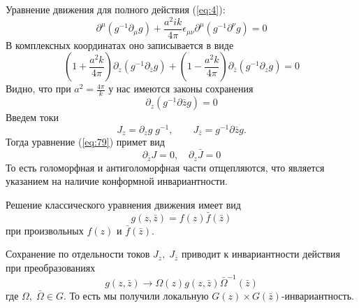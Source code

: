 Уравнение движения для полного действия (\ref{eq:4}):
\begin{equation}
  \label{eq:77}
  \partial^{\mu}(g^{-1}\partial_{\mu}g)+\frac{a^2 ik}{4\pi}\epsilon_{\mu\nu}\partial^{\mu}(g^{-1}\partial^{\nu}g)=0
\end{equation}
В комплексных координатах оно записывается в виде
\begin{equation}
  \label{eq:78}
  \left(1+\frac{a^2 k}{4\pi}\right)\partial_z(g^{-1}\partial_{\bar z}g)+\left(1-\frac{a^2 k}{4\pi}\right)\partial_{\bar z}(g^{-1}\partial_z g)=0
\end{equation}
Видно, что при $a^2=\frac{4\pi}{k}$ у нас имеются законы сохранения
\begin{equation}
  \label{eq:79}
  \partial_z(g^{-1}\partial{\bar z}g)=0
\end{equation}
Введем токи
\begin{equation}
  \label{eq:72}
  J_z=\partial_z g\;g^{-1}, \qquad J_{\bar{z}}=g^{-1}\partial{\bar z}g.
\end{equation}
Тогда уравнение (\ref{eq:79}) примет вид
\begin{equation}
  \label{eq:100}
  \partial_{\bar z}J=0,\quad \partial_z \bar J=0
\end{equation}
То есть голоморфная и антиголоморфная части отщепляются, что является указанием на наличие
конформной инвариантности.

Решение классического уравнения движения имеет вид
\begin{equation}
  \label{eq:80}
  g(z,\bar z)=f(z)\bar f(\bar z)
\end{equation}
при произвольных $f(z)$ и $\bar f (\bar z)$.

Сохранение по отдельности токов $J_z,\; J_{\bar z}$ приводит к инвариантности действия при преобразованиях
\begin{equation}
  \label{eq:81}
   g(z,\bar z)\to \Omega(z)g(z,\bar z)\bar \Omega^{-1}(\bar z)
\end{equation}
где $\Omega,\;\bar \Omega \in G$. То есть мы получили локальную $G(z)\times G(\bar z)$-инвариантность.

